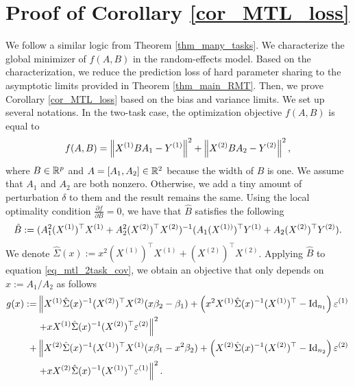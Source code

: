 \section{Proof of Corollary \ref{cor_MTL_loss}}\label{app_iso_cov}

We follow a similar logic from Theorem \ref{thm_many_tasks}.
We characterize the global minimizer of $f(A, B)$ in the random-effects model.
Based on the characterization, we reduce the prediction loss of hard parameter sharing to the asymptotic limits provided in Theorem \ref{thm_main_RMT}.
Then, we prove Corollary \ref{cor_MTL_loss} based on the bias and variance limits.
We set up several notations.
In the two-task case, the optimization objective $f(A, B)$ is equal to
	\begin{align}
		f(A, B) =   \left\| X^{(1)} B A_1 - Y^{(1)} \right\|^2+ \left\| X^{(2)} B A_2 - Y^{(2)} \right\|^2, \label{eq_mtl_2task_cov}
	\end{align}
	where $B \in \mathbb{R}^{p}$ and $A = [A_1, A_2]\in \mathbb{R}^{2}$ because the width of $B$ is one.
We assume that $A_1$ and $A_2$ are both nonzero.
Otherwise, we add a tiny amount of perturbation $\delta$ to them and the result remains the same.
Using the local optimality condition $\frac{\partial f}{\partial B} = 0$, we have that $\hat{B}$ satisfies the following
	\begin{align}
		\hat{B} \define  (A_1^2 (X^{(1)})^{\top}X^{(1)} + A_2^2 (X^{(2)})^{\top}X^{(2)})^{-1} (A_1 (X^{(1))})^{\top}Y^{(1)} + A_2 (X^{(2)})^{\top}Y^{(2)}). \label{eq_Bhat_2task} %
	\end{align}
We denote $\hat \Sigma(x):= x^2 (X^{(1)})^\top X^{(1)}  + (X^{(2)})^\top X^{(2)}$.
Applying $\hat B$ to equation \eqref{eq_mtl_2task_cov}, we obtain an objective that only depends on $x:=A_1/A_2$ as follows %
 \begin{align}
		 g(x) := & \left\| X^{(1)} \hat\Sigma(x)^{-1} (X^{(2)})^\top X^{(2)} (x\beta_2-\beta_1)+ \left(x^2 X^{(1)}\hat \Sigma(x)^{-1} (X^{(1)})^\top-\operatorname{Id}_{n_1}\right)\varepsilon^{(1)} \right. \nonumber\\
		& \left. + x X^{(1)}\hat \Sigma(x)^{-1} (X^{(2)})^\top \varepsilon^{(2)} \right\|^2 \nonumber\\
		 + & \left\| X^{(2)} \hat \Sigma(x)^{-1} (X^{(1)})^\top X^{(1)} (x\beta_1-x^2\beta_2)+ \left(X^{(2)}\hat\Sigma(x)^{-1} (X^{(2)})^\top-\operatorname{Id}_{n_2}\right)\varepsilon^{(2)} \right. \nonumber\\
		 &\left. + x X^{(2)}\hat \Sigma(x)^{-1} (X^{(1)})^\top \varepsilon^{(1)} \right\|^2.
		\label{eq_mtl_A12}
	\end{align}
